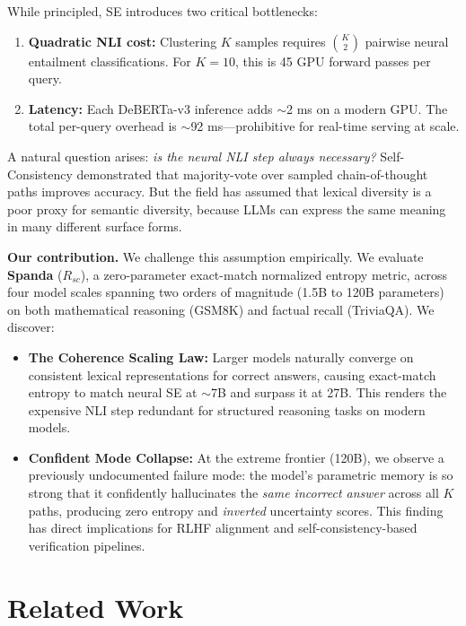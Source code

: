 \documentclass[11pt]{article}
\begin{document}
While principled, SE introduces two critical bottlenecks:
\begin{enumerate}
    \item \textbf{Quadratic NLI cost:} Clustering $K$ samples requires $\binom{K}{2}$ pairwise neural entailment classifications. For $K=10$, this is 45 GPU forward passes per query.
    \item \textbf{Latency:} Each DeBERTa-v3 inference adds $\sim$2 ms on a modern GPU. The total per-query overhead is $\sim$92 ms---prohibitive for real-time serving at scale.
\end{enumerate}

A natural question arises: \textit{is the neural NLI step always necessary?} Self-Consistency \cite{wang2022self} demonstrated that majority-vote over sampled chain-of-thought paths improves accuracy. But the field has assumed that lexical diversity is a poor proxy for semantic diversity, because LLMs can express the same meaning in many different surface forms.

\textbf{Our contribution.} We challenge this assumption empirically. We evaluate \textbf{Spanda} ($R_{sc}$), a zero-parameter exact-match normalized entropy metric, across four model scales spanning two orders of magnitude (1.5B to 120B parameters) on both mathematical reasoning (GSM8K) and factual recall (TriviaQA). We discover:

\begin{itemize}
    \item \textbf{The Coherence Scaling Law:} Larger models naturally converge on consistent lexical representations for correct answers, causing exact-match entropy to match neural SE at $\sim$7B and surpass it at 27B. This renders the expensive NLI step redundant for structured reasoning tasks on modern models.
    \item \textbf{Confident Mode Collapse:} At the extreme frontier (120B), we observe a previously undocumented failure mode: the model's parametric memory is so strong that it confidently hallucinates the \textit{same incorrect answer} across all $K$ paths, producing zero entropy and \textit{inverted} uncertainty scores. This finding has direct implications for RLHF alignment and self-consistency-based verification pipelines.
\end{itemize}

\section{Related Work}
\end{document}
